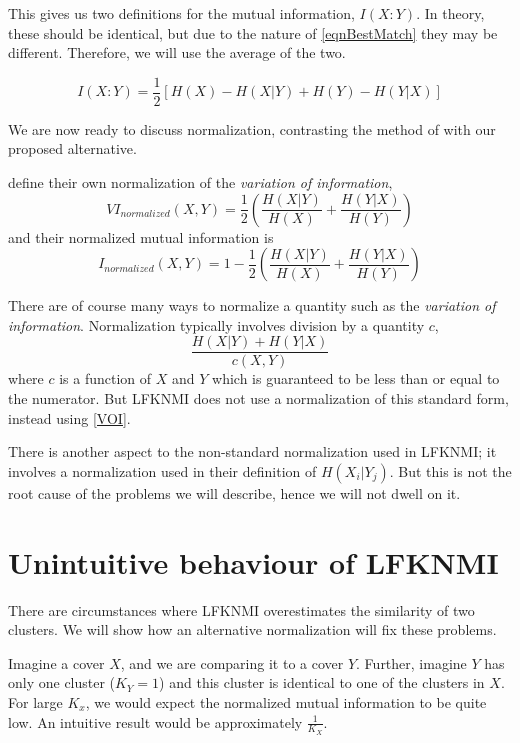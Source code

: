 \documentclass[9pt,technote]{IEEEtran}
\begin{document}
This gives us two definitions for the mutual information, $I(X:Y)$.
In theory, these should be identical, but due to the nature of \cref{eqnBestMatch}
they may be different. Therefore, we will use the average of the two.

\begin{equation}
	I(X:Y) = \frac12 \left[ H(X)-H(X|Y) + H(Y)-H(Y|X) \right]
\end{equation}

We are now ready to discuss normalization, contrasting the method of \lfk
with our proposed alternative.

\citet{lancichinetti-2009} define their own normalization of the \emph{variation of information},
\begin{equation}
	VI_{normalized}(X,Y) = \frac12 \left(  \frac{ H(X|Y) }{ H(X) } + \frac{ H(Y|X) }{ H(Y) } \right)   \label{VOI}
\end{equation}
and their normalized mutual information is
\begin{equation}
	I_{normalized}(X,Y) = 1 - \frac12 \left(  \frac{ H(X|Y) }{ H(X) } + \frac{ H(Y|X) }{ H(Y) } \right) %
\end{equation}

There are of course many ways to normalize a quantity such as the \emph{variation of information}.
Normalization typically involves division by a quantity $c$,
\begin{equation}
	\frac{ H(X|Y) + H(Y|X) } {c(X,Y)} \label{eqnNorms}
\end{equation}
where $c$ is a function of $X$ and $Y$ which is guaranteed to be less than or equal to the numerator.
But LFKNMI does not use a normalization of this standard form, instead using \cref{VOI}.

There is another aspect to the non-standard normalization used in LFKNMI;
it involves a normalization used in their definition of $H(X_i|Y_j)$. But this is not the root
cause of the problems we will describe, hence we will not dwell on it.

\section{Unintuitive behaviour of LFKNMI}
There are circumstances where LFKNMI overestimates the similarity of two clusters.
We will show how an alternative normalization will fix these problems.

Imagine a cover $X$, and we are comparing it to a cover $Y$. Further, imagine $Y$ has only one
cluster ($K_Y=1$) and this cluster is identical to one of the clusters in $X$.
For large $K_x$, we would expect the normalized mutual information to be quite low.
An intuitive result would be approximately $\frac1{K_X}$.
\end{document}

